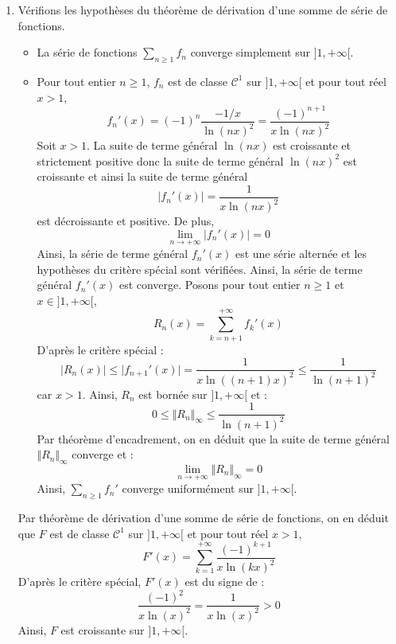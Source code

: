 \documentclass[a4paper,twoside,french,11pt]{VcCours}
\newcommand{\Sum}[2]{\sum_{#1}^{#2}}
\begin{document}
\begin{enumerate}
\medskip

$\rhd$ Pour tout $x \in ]1, + \infty[$,
$$ F(x) = - \dfrac{1}{\ln(x)} + \sum_{n=2}^{+ \infty} f_n(x)$$
La série $\Sum{n\geq 2}{} f_n$ converge uniformément sur $]1, + \infty[$ donc $1$ est une extrémité. Pour tout $n \geq 2$,
$$ \lim_{x \rightarrow 1} f_n(x) = \dfrac{(-1)^n}{\ln(n)}$$
Par théorème d'interversion limite-somme, on en déduit que la somme de $\Sum{n\geq 2}{} f_n$ admet une limite finie en $1^+$ valant :
$$ \sum_{n=2}^{+ \infty} \dfrac{(-1)^n}{\ln(n)}$$
Ainsi, $x \mapsto F(x) + \dfrac{1}{\ln(x)}$ admet une limite finie quand $x$ tend vers $1^+$. Or :
$$ \lim_{x \rightarrow 1^+} \dfrac{1}{\ln(x)} = + \infty$$
On en déduit que $F$ admet pour limite $- \infty$ en $1^{+}$ (par somme d'une fonction ayant cette limite et d'une fonction admettant une limite finie).
\item Vérifions les hypothèses du théorème de dérivation d'une somme de série de fonctions.
\begin{itemize}
\item La série de fonctions $\Sum{n\geq 1}{} f_n$ converge simplement sur $]1, + \infty[$.
\item Pour tout entier $n \geq 1$, $f_n$ est de classe $\mathcal{C}^1$ sur $]1, + \infty[$ et pour tout réel $x>1$,
$$ f_n'(x) = (-1)^n \dfrac{-1/x}{\ln(nx)^2} = \dfrac{(-1)^{n+1}}{x \ln(nx)^2}$$
Soit $x>1$. La suite de terme général $\ln(nx)$ est croissante et strictement positive donc la suite de terme général $\ln(nx)^2$ est croissante et ainsi la suite de terme général 
$$ \vert f_n'(x) \vert = \dfrac{1}{x \ln(nx)^2}$$
est décroissante et positive. De plus,
$$ \lim_{n \rightarrow + \infty} \vert f_n'(x) \vert = 0$$
Ainsi, la série de terme général $f_n'(x)$ est une série alternée et les hypothèses du critère spécial sont vérifiées. Ainsi, la série de terme général $f_n'(x)$ est converge. Posons pour tout entier $n \geq 1$ et $x \in ]1, + \infty[$,
$$ R_n(x) = \sum_{k=n+1}^{+ \infty} f_k'(x)$$
D'après le critère spécial :
$$ \vert R_n(x) \vert \leq \vert f_{n+1}'(x) \vert = \dfrac{1}{x \ln((n+1)x)^2} \leq \dfrac{1}{\ln(n+1)^2}$$
car $x>1$. Ainsi, $R_n$ est bornée sur $]1, + \infty[$ et :
$$ 0 \leq \Vert R_n \Vert_{\infty} \leq \dfrac{1}{\ln(n+1)^2}$$
Par théorème d'encadrement, on en déduit que la suite de terme général $\Vert R_n \Vert_{\infty}$ converge et :
$$ \lim_{n \rightarrow + \infty} \Vert R_n \Vert_{\infty} = 0$$
Ainsi, $\Sum{n\geq 1}{} f_n'$ converge uniformément sur $]1, + \infty[$.
\end{itemize}
Par théorème de dérivation d'une somme de série de fonctions, on en déduit que $F$ est de classe $\mathcal{C}^1$ sur $]1, + \infty[$ et pour tout réel $x>1$,
$$ F'(x) = \sum_{k=1}^{+ \infty} \dfrac{(-1)^{k+1}}{x \ln(kx)^2}$$
D'après le critère spécial, $F'(x)$ est du signe de :
$$ \dfrac{(-1)^{2}}{x \ln(x)^2} = \dfrac{1}{x \ln(x)^2}>0$$
Ainsi, $F$ est croissante sur $]1, + \infty[$.


\end{enumerate}
\end{document}
